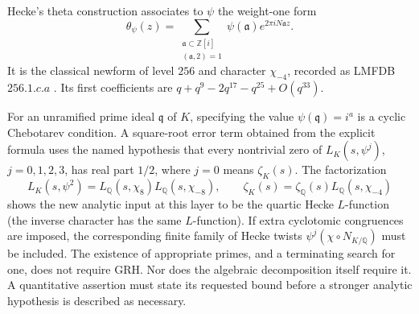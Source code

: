 Hecke's theta construction associates to $\psi$ the weight-one form
\[
 \theta_\psi(z)=\sum_{\substack{\mathfrak a\subset\mathbb Z[i]\\
                     (\mathfrak a,2)=1}}
                 \psi(\mathfrak a)e^{2\pi i N\mathfrak a z}.
\]
It is the classical newform of level $256$ and character $\chi_{-4}$, recorded
as LMFDB $256.1.c.a$ \cite{LMFDB256}. Its first coefficients are
$q+q^9-2q^{17}-q^{25}+O(q^{33})$.

For an unramified prime ideal $\mathfrak q$ of $K$, specifying the value
$\psi(\mathfrak q)=i^a$ is a cyclic Chebotarev condition. A square-root
error term obtained from the explicit formula uses the named hypothesis
that every nontrivial zero of $L_K(s,\psi^j)$, $j=0,1,2,3$, has real part
$1/2$, where $j=0$ means $\zeta_K(s)$. The factorization
\[
 L_K(s,\psi^2)=L_{\mathbb Q}(s,\chi_8)
                    L_{\mathbb Q}(s,\chi_{-8}),\qquad
 \zeta_K(s)=\zeta_{\mathbb Q}(s)L_{\mathbb Q}(s,\chi_{-4})
\]
shows the new analytic input at this layer to be the quartic Hecke
$L$-function (the inverse character has the same $L$-function).
If extra cyclotomic congruences are imposed, the corresponding finite family
of Hecke twists $\psi^j(\chi\circ N_{K/\mathbb Q})$ must be included.
The existence of appropriate primes, and a terminating search for one, does
not require GRH. Nor does the algebraic decomposition itself require it.
A quantitative assertion must state its requested bound before a stronger
analytic hypothesis is described as necessary.
